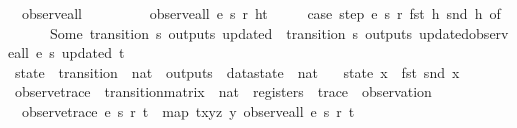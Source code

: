 \begin{isabellebody}
\ \ {\isachardoublequoteopen}observe{\isacharunderscore}all\ {\isacharunderscore}\ {\isacharunderscore}\ {\isacharunderscore}\ {\isacharbrackleft}{\isacharbrackright}\ {\isacharequal}\ {\isacharbrackleft}{\isacharbrackright}{\isachardoublequoteclose}\ {\isacharbar}\isanewline
\ \ {\isachardoublequoteopen}observe{\isacharunderscore}all\ e\ s\ r\ {\isacharparenleft}h{\isacharhash}t{\isacharparenright}\ {\isacharequal}\isanewline
\ \ \ \ {\isacharparenleft}case\ {\isacharparenleft}step\ e\ s\ r\ {\isacharparenleft}fst\ h{\isacharparenright}\ {\isacharparenleft}snd\ h{\isacharparenright}{\isacharparenright}\ of\isanewline
\ \ \ \ \ \ {\isacharparenleft}Some\ {\isacharparenleft}transition{\isacharcomma}\ s{\isacharprime}{\isacharcomma}\ outputs{\isacharcomma}\ updated{\isacharparenright}{\isacharparenright}\ {\isasymRightarrow}\ {\isacharparenleft}{\isacharparenleft}{\isacharparenleft}transition{\isacharcomma}\ s{\isacharprime}{\isacharcomma}\ outputs{\isacharcomma}\ updated{\isacharparenright}{\isacharhash}{\isacharparenleft}observe{\isacharunderscore}all\ e\ s{\isacharprime}\ updated\ t{\isacharparenright}{\isacharparenright}{\isacharparenright}\ {\isacharbar}\isanewline
\ \ \ \ \ \ {\isacharunderscore}\ {\isasymRightarrow}\ {\isacharbrackleft}{\isacharbrackright}\isanewline
\ \ \ \ {\isacharparenright}{\isachardoublequoteclose}\isanewline
\isanewline
{}\isamarkupfalse%
\ state\ {\isacharcolon}{\isacharcolon}\ {\isachardoublequoteopen}{\isacharparenleft}transition\ {\isasymtimes}\ nat\ {\isasymtimes}\ outputs\ {\isasymtimes}\ datastate{\isacharparenright}\ {\isasymRightarrow}\ nat{\isachardoublequoteclose}\ \isanewline
\ \ {\isachardoublequoteopen}state\ x\ {\isasymequiv}\ fst\ {\isacharparenleft}snd\ x{\isacharparenright}{\isachardoublequoteclose}\isanewline
\isanewline
{}\isamarkupfalse%
\ observe{\isacharunderscore}trace\ {\isacharcolon}{\isacharcolon}\ {\isachardoublequoteopen}transition{\isacharunderscore}matrix\ {\isasymRightarrow}\ nat\ {\isasymRightarrow}\ registers\ {\isasymRightarrow}\ trace\ {\isasymRightarrow}\ observation{\isachardoublequoteclose}\ \isanewline
\ \ {\isachardoublequoteopen}observe{\isacharunderscore}trace\ e\ s\ r\ t\ {\isasymequiv}\ map\ {\isacharparenleft}{\isasymlambda}{\isacharparenleft}t{\isacharcomma}x{\isacharcomma}y{\isacharcomma}z{\isacharparenright}{\isachardot}\ y{\isacharparenright}\ {\isacharparenleft}observe{\isacharunderscore}all\ e\ s\ r\ t{\isacharparenright}{\isachardoublequoteclose}\isanewline
\isanewline
{}\isamarkupfalse%

\end{isabellebody}
